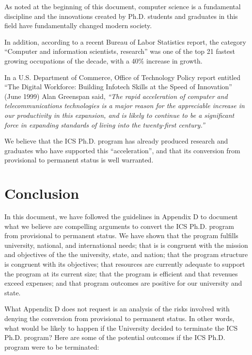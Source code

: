 \documentclass[12pt]{article}
\begin{document}
As noted at the beginning of this document, computer science is a
fundamental discipline and the innovations created by Ph.D. students and
graduates in this field have fundamentally changed modern society. 

In addition, according to a recent Bureau of Labor Statistics report, the
category ``Computer and information scientists, research'' was one of the
top 21 fastest growing occupations of the decade, with a 40\% increase in
growth. 

In a U.S. Department of Commerce, Office of Technology Policy report
entitled “The Digital Workforce: Building Infotech Skills at the Speed of
Innovation” (June 1999) Alan Greenspan said, {\em ``The rapid acceleration of
computer and telecommunications technologies is a major reason for the
appreciable increase in our productivity in this expansion, and is likely
to continue to be a significant force in expanding standards of living into
the twenty-first century.”}  

We believe that the ICS Ph.D. program has already produced research and
graduates who have supported this ``acceleration'', and that its conversion
from provisional to permanent status is well warranted.

\section{Conclusion}

In this document, we have followed the guidelines in Appendix D to document
what we believe are compelling arguments to convert the ICS Ph.D. program
from provisional to permanent status.  We have shown that the program
fulfills university, national, and international needs; that is is
congruent with the mission and objectives of the the university, state, and
nation; that the program structure is congruent with its objectives; that
resources are currently adequate to support the program at its current
size; that the program is efficient and that revenues exceed expenses; and
that program outcomes are positive for our university and state.

What Appendix D does not request is an analysis of the risks involved with
denying the conversion from provisional to permanent status. In other
words, what would be likely to happen if the University decided to
terminate the ICS Ph.D. program? Here are some of the potential outcomes if
the ICS Ph.D. program were to be terminated:
\end{document}
